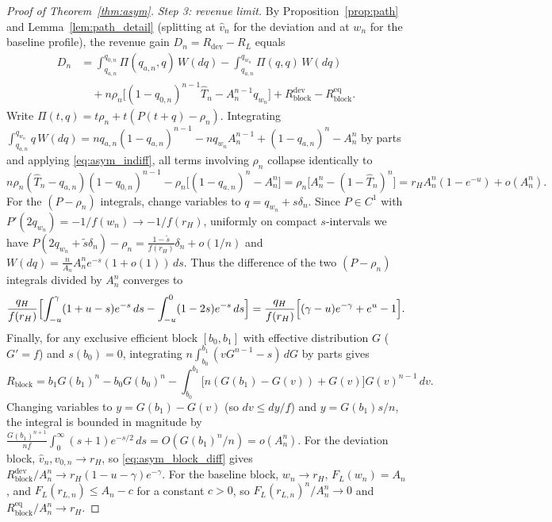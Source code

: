 \documentclass[12pt]{article}
\theoremstyle{mystyle}
\theoremstyle{mystyle2}
\newcommand{\1}{\mathbf{1}}
\begin{document}
\begin{proof}[Proof of Theorem~\ref{thm:asym}]
\emph{Step 3: revenue limit.} By Proposition~\ref{prop:path} and Lemma~\ref{lem:path_detail} (splitting at $\hat v_n$ for the deviation and at $w_n$ for the baseline profile), the revenue gain $D_n=R_{\mathrm{dev}}-R_L$ equals
\begin{align*}
D_n &= \int_{q_{a,n}}^{q_{0,n}}\Pi(q_{a,n},q)\,W(dq) - \int_{q_{a,n}}^{q_{w_n}}\Pi(q,q)\,W(dq) \\
&\quad + n\rho_n\bigl[(1-q_{0,n})^{n-1}\hat T_n - A_n^{n-1}q_{w_n}\bigr] + R_{\mathrm{block}}^{\mathrm{dev}} - R_{\mathrm{block}}^{\mathrm{eq}}.
\end{align*}
Write $\Pi(t,q)=t\rho_n+t(P(t+q)-\rho_n)$. Integrating $\int_{q_{a,n}}^{q_{w_n}}q\,W(dq)=n q_{a,n}(1-q_{a,n})^{n-1}-n q_{w_n}A_n^{n-1}+(1-q_{a,n})^n-A_n^n$ by parts and applying \eqref{eq:asym_indiff}, all terms involving $\rho_n$ collapse identically to
\[
n\rho_n(\hat T_n-q_{a,n})(1-q_{0,n})^{n-1} - \rho_n\bigl[(1-q_{a,n})^n-A_n^n\bigr] = \rho_n\bigl[A_n^n-(1-\hat T_n)^n\bigr] = r_H A_n^n(1-e^{-u}) + o(A_n^n).
\]
For the $(P-\rho_n)$ integrals, change variables to $q=q_{w_n}+s\delta_n$. Since $P\in C^1$ with $P'(2q_{w_n})=-1/f(w_n)\to -1/f(r_H)$, uniformly on compact $s$-intervals we have $P(2q_{w_n}+\tilde s\delta_n)-\rho_n=\frac{1-\tilde s}{f(r_H)}\delta_n+o(1/n)$ and $W(dq)=\frac{n}{A_n}A_n^n e^{-s}(1+o(1))\,ds$. Thus the difference of the two $(P-\rho_n)$ integrals divided by $A_n^n$ converges to
\[
\frac{q_H}{f(r_H)}\Bigl[\int_{-u}^{\gamma}(1+u-s)e^{-s}\,ds - \int_{-u}^{0}(1-2s)e^{-s}\,ds\Bigr]
= \frac{q_H}{f(r_H)}\Bigl[(\gamma-u)e^{-\gamma} + e^u - 1\Bigr].
\]
Finally, for any exclusive efficient block $[b_0,b_1]$ with effective distribution $G$ ($G'=f$) and $s(b_0)=0$, integrating $n\int_{b_0}^{b_1}(vG^{n-1}-s)\,dG$ by parts gives
\[
R_{\mathrm{block}} = b_1 G(b_1)^n - b_0 G(b_0)^n - \int_{b_0}^{b_1} \bigl[n(G(b_1)-G(v))+G(v)\bigr]G(v)^{n-1}\,dv.
\]
Changing variables to $y=G(b_1)-G(v)$ (so $dv\le dy/\underline f$) and $y=G(b_1)s/n$, the integral is bounded in magnitude by $\frac{G(b_1)^{n+1}}{n\underline f}\int_0^\infty (s+1)e^{-s/2}\,ds = O(G(b_1)^n/n) = o(A_n^n)$. For the deviation block, $\hat v_n,v_{0,n}\to r_H$, so \eqref{eq:asym_block_diff} gives $R_{\mathrm{block}}^{\mathrm{dev}}/A_n^n\to r_H(1-u-\gamma)e^{-\gamma}$. For the baseline block, $w_n\to r_H$, $F_L(w_n)=A_n$, and $F_L(r_{L,n})\le A_n-c$ for a constant $c>0$, so $F_L(r_{L,n})^n/A_n^n\to 0$ and $R_{\mathrm{block}}^{\mathrm{eq}}/A_n^n\to r_H$.


\end{proof}
\end{document}
